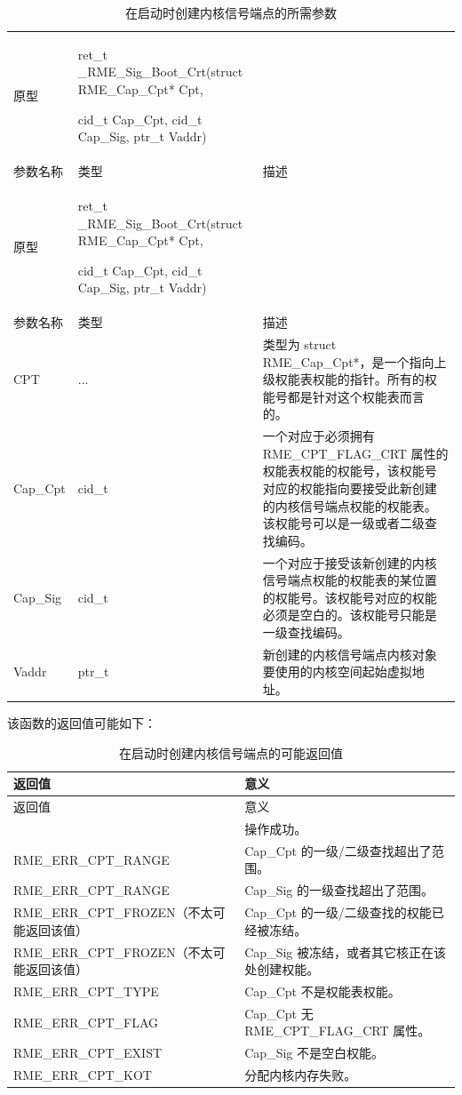 \begin{xltabular}{\textwidth}{@{}>{\hsize\raggedright\arraybackslash}X>{\hsize\raggedright\arraybackslash}X>{\hsize\raggedright\arraybackslash}X@{}}
\caption{在启动时创建内核信号端点的所需参数}\label{tab:7-57-create-kernel-signal-endpoint-at-boot-parameters}\\
\toprule
原型\strut
 & ret\_t \_RME\_Sig\_Boot\_Crt(struct RME\_Cap\_Cpt* Cpt,

cid\_t Cap\_Cpt, cid\_t Cap\_Sig, ptr\_t Vaddr)\strut
 & \strut
\tabularnewline
参数名称 & 类型 & 描述\tabularnewline
\endfirsthead
\toprule
原型\strut
 & ret\_t \_RME\_Sig\_Boot\_Crt(struct RME\_Cap\_Cpt* Cpt,

cid\_t Cap\_Cpt, cid\_t Cap\_Sig, ptr\_t Vaddr)\strut
 & \strut
\tabularnewline
参数名称 & 类型 & 描述\tabularnewline
\midrule
\endhead
\bottomrule
\endlastfoot
CPT & ... &
类型为 struct RME\_Cap\_Cpt*，是一个指向上级权能表权能的指针。所有的权能号都是针对这个权能表而言的。\tabularnewline
Cap\_Cpt & cid\_t &
一个对应于必须拥有 RME\_CPT\_FLAG\_CRT 属性的权能表权能的权能号，该权能号对应的权能指向要接受此新创建的内核信号端点权能的权能表。该权能号可以是一级或者二级查找编码。\tabularnewline
Cap\_Sig & cid\_t &
一个对应于接受该新创建的内核信号端点权能的权能表的某位置的权能号。该权能号对应的权能必须是空白的。该权能号只能是一级查找编码。\tabularnewline
Vaddr & ptr\_t &
新创建的内核信号端点内核对象要使用的内核空间起始虚拟地址。\tabularnewline
\end{xltabular}

该函数的返回值可能如下：

\begin{xltabular}{\textwidth}{@{}>{\hsize\raggedright\arraybackslash}X>{\hsize\raggedright\arraybackslash}X@{}}
\caption{在启动时创建内核信号端点的可能返回值}\label{tab:7-58-create-kernel-signal-endpoint-at-boot-return-values}\\
\toprule
返回值 & 意义\tabularnewline
\endfirsthead
\toprule
返回值 & 意义\tabularnewline
\midrule
\endhead
\bottomrule
{} & 操作成功。\tabularnewline
    RME\_ERR\_CPT\_RANGE & Cap\_Cpt 的一级/二级查找超出了范围。\tabularnewline
    RME\_ERR\_CPT\_RANGE & Cap\_Sig 的一级查找超出了范围。\tabularnewline
    RME\_ERR\_CPT\_FROZEN（不太可能返回该值） & Cap\_Cpt 的一级/二级查找的权能已经被冻结。\tabularnewline
    RME\_ERR\_CPT\_FROZEN（不太可能返回该值） & Cap\_Sig 被冻结，或者其它核正在该处创建权能。\tabularnewline
    RME\_ERR\_CPT\_TYPE & Cap\_Cpt 不是权能表权能。\tabularnewline
    RME\_ERR\_CPT\_FLAG & Cap\_Cpt 无 RME\_CPT\_FLAG\_CRT 属性。\tabularnewline
    RME\_ERR\_CPT\_EXIST & Cap\_Sig 不是空白权能。\tabularnewline
    RME\_ERR\_CPT\_KOT & 分配内核内存失败。\tabularnewline
\end{xltabular}

